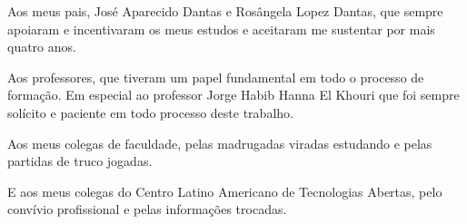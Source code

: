 
\begin{agradecimentos}
Aos meus pais, José Aparecido Dantas e Rosângela Lopez Dantas, que sempre apoiaram e incentivaram os
meus estudos e aceitaram me sustentar por mais quatro anos.

Aos professores, que tiveram um papel fundamental em todo o processo de formação. Em especial ao professor
Jorge Habib Hanna El Khouri que foi sempre solícito e paciente em todo processo deste trabalho.

Aos meus colegas de faculdade, pelas madrugadas viradas estudando e pelas partidas de truco jogadas.

E aos meus colegas do Centro Latino Americano de Tecnologias Abertas, pelo convívio profissional e pelas
informações trocadas.
\end{agradecimentos}
